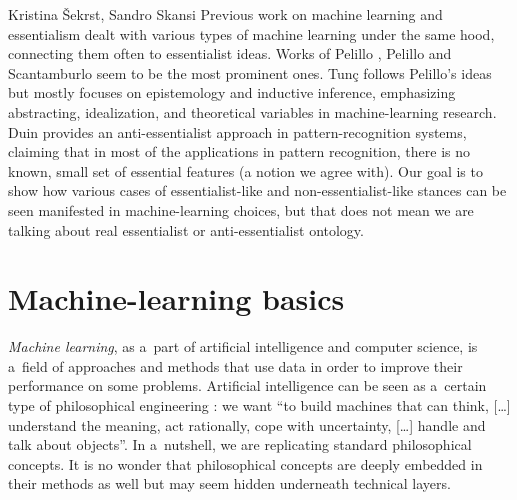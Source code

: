 \begin{artengenv2auth}{Kristina Šekrst, Sandro Skansi}
Previous work on machine learning and essentialism dealt with various types of machine learning under the same hood, connecting them often to essentialist ideas. Works of Pelillo
\parencite*[][]{pelillo_introduction_2013}, %
 Pelillo and Scantamburlo 
\parencite*[][]{hutchison_how_2013} %
 seem to be the most prominent ones. Tunç 
\parencite*[][]{tunc_semantics_2015} %
 follows Pelillo's 
\parencite*[][]{pelillo_introduction_2013} %
 ideas but mostly focuses on epistemology and inductive inference, emphasizing abstracting, idealization, and theoretical variables in machine-learning research. Duin 
\parencite*[][]{duin_dissimilarity_2015} %
 provides an anti-essentialist approach in pattern-recognition systems, claiming that in most of the applications in pattern recognition, there is no known, small set of essential features (a notion we agree with). Our goal is to show how various cases of essentialist-like and non-essentialist-like stances can be seen manifested in machine-learning choices, but that does not mean we are talking about real essentialist or anti-essentialist ontology.

\section{Machine-learning basics}
\textit{Machine learning}, as a~part of artificial intelligence and computer science, is a~field of approaches and methods that use data in order to improve their performance on some problems. Artificial intelligence can be seen as a~certain type of philosophical engineering
\parencite[][p.vii]{skansi_introduction_2018}: %
 we want ``to build machines that can think, [\ldots] understand the meaning, act rationally, cope with uncertainty, [\ldots] handle and talk about objects''. In a~nutshell, we are replicating standard philosophical concepts. It is no wonder that philosophical concepts are deeply embedded in their methods as well but may seem hidden underneath technical layers.


\end{artengenv2auth}
